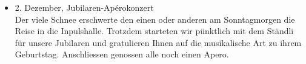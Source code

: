 \begin{history}
\begin{itemize}
        \item 2. Dezember, Jubilaren-Apérokonzert\\
              Der viele Schnee erschwerte den einen oder anderen am Sonntagmorgen die
              Reise in die Inpulshalle. Trotzdem starteten wir pünktlich mit dem
              Ständli für unsere Jubilaren und gratulieren Ihnen auf die musikalische
              Art zu ihrem Geburtstag. Anschliessen genossen alle noch einen Apero.

    \end{itemize}

\end{history}
